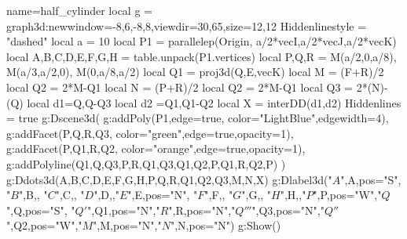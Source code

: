 \documentclass{standalone}
\begin{document}
\begin{luadraw}{name=half_cylinder}
local g = graph3d:new{window={-8,6,-8,8},viewdir={30,65},size={12,12}}
Hiddenlinestyle = "dashed"
local a  = 10
local P1 = parallelep(Origin, a/2*vecI,a/2*vecJ,a/2*vecK)
local A,B,C,D,E,F,G,H = table.unpack(P1.vertices)
local P,Q,R = M(a/2,0,a/8), M(a/3,a/2,0), M(0,a/8,a/2)
local Q1 = proj3d(Q,{E,vecK})
local M = (F+R)/2
local Q2 = 2*M-Q1
local N = (P+R)/2
local Q2 = 2*M-Q1
local Q3 = 2*(N)-(Q)
local d1={Q,Q-Q3}
local d2 ={Q1,Q1-Q2}
local X = interDD(d1,d2)
Hiddenlines = true
g:Dscene3d(
    g:addPoly(P1,{edge=true, color="LightBlue",edgewidth=4}),
    g:addFacet({P,Q,R,Q3}, {color="green",edge=true,opacity=1}),
    g:addFacet({P,Q1,R,Q2}, {color="orange",edge=true,opacity=1}),
    g:addPolyline({{Q1,Q,Q3},{P,R},{Q1,Q3},{Q1,Q2},{P,Q1,R,Q2,P}})
)
g:Ddots3d({A,B,C,D,E,F,G,H,P,Q,R,Q1,Q2,Q3,M,N,X})
g:Dlabel3d("$A$",A,{pos="S"}, "$B$",B,{}, "$C$",C,{}, "$D$",D,{},"$E$",E,{pos="N"}, "$F$",F,{}, "$G$",G,{}, "$H$",H,{},"$P$",P,{pos="W"},"$Q$",Q,{pos="S"}, "$Q'$",Q1,{pos="N"},"$R$",R,{pos="N"},"$Q'''$",Q3,{pos="N"},"$Q''$",Q2,{pos="W"},"$M$",M,{pos="N"},"$N$",N,{pos="N"}) 
 g:Show()
\end{luadraw}
\end{document}

